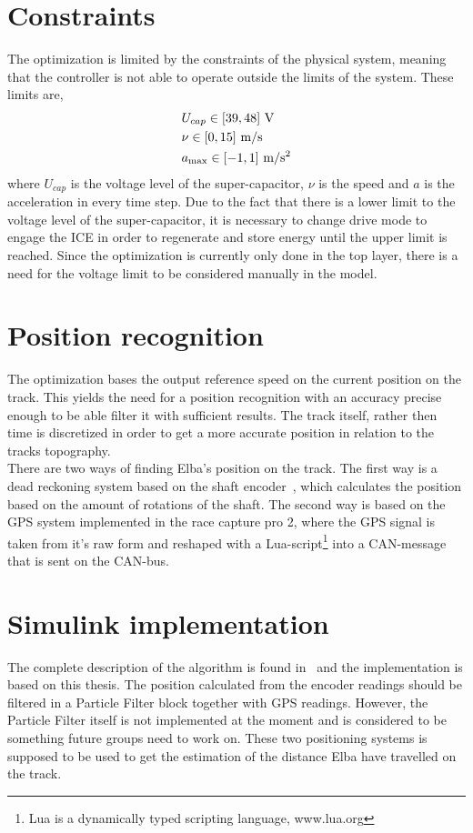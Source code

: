 \section{Constraints}
The optimization is limited by the constraints of the physical system, meaning that
the controller is not able to operate outside the limits of the system. These limits
are,
\begin{align}
    &U_{cap} \in [39,48]~\textup{V} \\
    &\nu \in [0,15]~\textup{m/s}\\
    &a_{\max} \in [-1,1]~\textup{m/s$^2$}
\end{align}
where $U_{cap}$ is the voltage level of the super-capacitor, $\nu$ is the speed
and $a$ is the acceleration in every time step. Due to the fact that there is a
lower limit to the voltage level of the super-capacitor, it is necessary to
change drive mode to engage the ICE in order to regenerate and store energy
until the upper limit is reached. Since the optimization is currently only done
in the top layer, there is a need for the voltage limit to be considered
manually in the model.

\section{Position recognition}\label{sec:opt_pos_recon}
The optimization bases the output reference speed on the current position on the
track. This yields the need for a position recognition with an accuracy precise
enough to be able filter it with sufficient results. The track itself, rather
then time is discretized in order to get a more accurate position in relation to
the tracks topography. \\
There are two ways of finding Elba's position on the track. The first way is a dead
reckoning system based on the shaft encoder~\cite[p.~49]{elba2015},
which calculates the position based on the amount of rotations of the shaft. The
second way is based on the GPS system implemented in the race capture pro 2,
where the GPS signal is taken from it's raw form and reshaped with a
Lua-script\footnote{Lua is a dynamically typed scripting language, www.lua.org}
into a CAN-message that is sent on the CAN-bus.

\section{Simulink implementation}
The complete description of the algorithm is found in~\cite{liu2016} and the
implementation is based on this thesis. The position calculated from the encoder readings should be filtered in a Particle Filter block together with GPS readings. However, the Particle
Filter itself is not implemented at the moment and is considered to be something
future groups need to work on. These two positioning systems is supposed to be
used to get the estimation of the distance Elba have travelled on the track.

